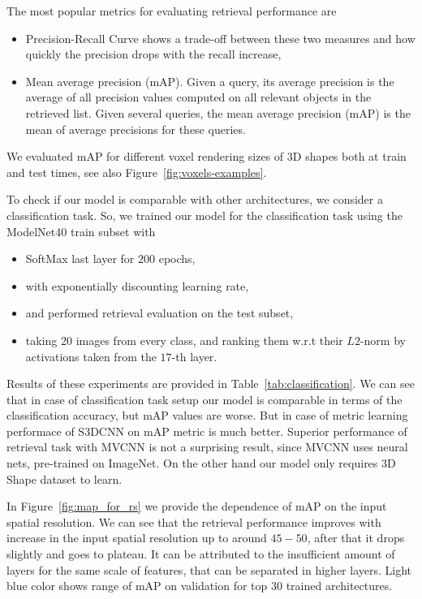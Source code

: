 The most popular metrics for evaluating retrieval performance are
\begin{itemize}
\item Precision-Recall Curve shows a trade-off between these two measures and how quickly the precision drops with the recall increase,
\item Mean average precision (mAP). Given a query, its average precision is the average of all precision values computed on all relevant objects in the retrieved list. Given several queries, the mean average precision (mAP) is the mean of average precisions for these queries. 
\end{itemize}
We evaluated mAP for different voxel rendering sizes of 3D shapes both at train and test times, see also Figure~\ref{fig:voxels-examples}.

To check if our model is comparable with other architectures, we consider a classification task. So, we trained our model for the classification task using the ModelNet40 train subset with 
\begin{itemize}
\item SoftMax last layer for $200$ epochs,
\item with exponentially discounting learning rate,
\item and performed retrieval evaluation on the test subset,
\item taking $20$ images from every class, and ranking them w.r.t their $L2$-norm by activations taken from the $17$-th layer.
\end{itemize}

Results of these experiments are provided in Table~\ref{tab:classification}. We can see that in case of classification task setup our model is comparable in terms of the classification accuracy, but mAP values are worse. But in case of metric learning performace of S3DCNN on mAP metric is much better.
Superior performance of retrieval task with MVCNN is not a surprising result, since MVCNN uses neural nets, pre-trained on ImageNet. On the other hand our model only requires 3D Shape dataset to learn.

In Figure~\ref{fig:map_for_rs} we provide the dependence of mAP on the input spatial resolution. We can see that the retrieval performance improves with increase in the input spatial resolution up to around $45-50$, after that it drops slightly and goes to plateau. It can be attributed to the insufficient amount of layers for the same scale of features, that can be separated in higher layers. Light blue color shows range of mAP on validation for top $30$ trained architectures.


